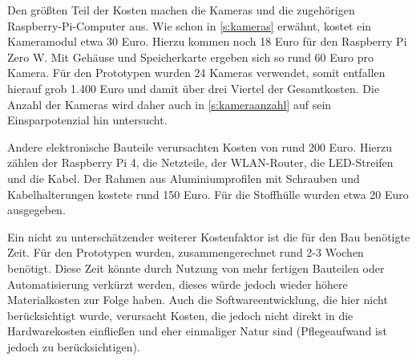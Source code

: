 \documentclass[./00PhotoBox.tex]{subfiles}
\begin{document}
Den größten Teil der Kosten machen die Kameras und die zugehörigen Raspberry-Pi-Computer aus. Wie schon in \autoref{s:kameras} erwähnt, kostet ein Kameramodul etwa 30 Euro. Hierzu kommen noch 18 Euro für den Raspberry Pi Zero W. Mit Gehäuse und Speicherkarte ergeben sich so rund 60 Euro pro Kamera. Für den Prototypen wurden 24 Kameras verwendet, somit entfallen hierauf grob 1.400 Euro und damit über drei Viertel der Gesamtkosten. Die Anzahl der Kameras wird daher auch in \autoref{s:kameraanzahl} auf sein Einsparpotenzial hin untersucht.

Andere elektronische Bauteile verursachten Kosten von rund 200 Euro. Hierzu zählen der Raspberry Pi 4, die Netzteile, der WLAN-Router, die LED-Streifen und die Kabel. Der Rahmen aus Aluminiumprofilen mit Schrauben und Kabelhalterungen kostete rund 150 Euro. Für die Stoffhülle wurden etwa 20 Euro ausgegeben.

Ein nicht zu unterschätzender weiterer Kostenfaktor ist die für den Bau benötigte Zeit. Für den Prototypen wurden, zusammengerechnet rund 2-3 Wochen benötigt. Diese Zeit könnte durch Nutzung von mehr fertigen Bauteilen oder Automatisierung verkürzt werden, dieses würde jedoch wieder höhere Materialkosten zur Folge haben. Auch die Softwareentwicklung, die hier nicht berücksichtigt wurde, verursacht Kosten, die jedoch nicht direkt in die Hardwarekosten einfließen und eher einmaliger Natur sind (Pflegeaufwand ist jedoch zu berücksichtigen).

\biblio
\end{document}
